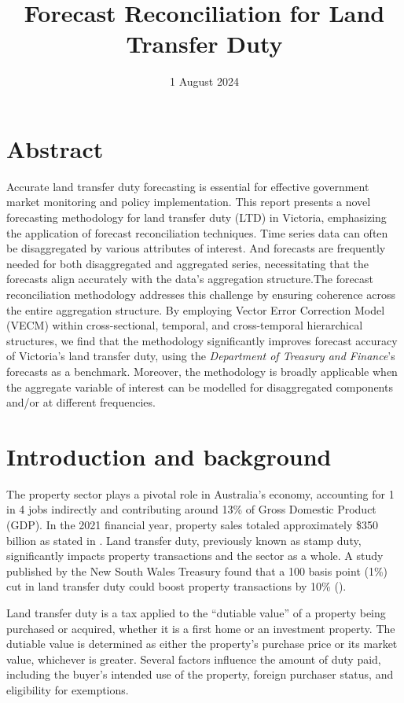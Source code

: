\documentclass[
  11pt,
  a4paper,
]{article}
\title{Forecast Reconciliation for Land Transfer Duty}
\date{1 August 2024}
\author{\sf{\Large\textbf{Hoang Do} \\[0.5cm]}}
\makeatletter
\def\maketitle{\front{\expandafter{\@title}}{\@author}{\@organization}}
\makeatother
\begin{document}
\maketitle

\section{Abstract}\label{abstract}

Accurate land transfer duty forecasting is essential for effective
government market monitoring and policy implementation. This report
presents a novel forecasting methodology for land transfer duty (LTD) in
Victoria, emphasizing the application of forecast reconciliation
techniques. Time series data can often be disaggregated by various
attributes of interest. And forecasts are frequently needed for both
disaggregated and aggregated series, necessitating that the forecasts
align accurately with the data's aggregation structure.The forecast
reconciliation methodology addresses this challenge by ensuring
coherence across the entire aggregation structure. By employing Vector
Error Correction Model (VECM) within cross-sectional, temporal, and
cross-temporal hierarchical structures, we find that the methodology
significantly improves forecast accuracy of Victoria's land transfer
duty, using the \emph{Department of Treasury and Finance}'s forecasts as
a benchmark. Moreover, the methodology is broadly applicable when the
aggregate variable of interest can be modelled for disaggregated
components and/or at different frequencies.

\section{Introduction and background}\label{introduction-and-background}

The property sector plays a pivotal role in Australia's economy,
accounting for 1 in 4 jobs indirectly and contributing around 13\% of
Gross Domestic Product (GDP). In the 2021 financial year, property sales
totaled approximately \$350 billion as stated in \textcite{reia_2022}.
Land transfer duty, previously known as stamp duty, significantly
impacts property transactions and the sector as a whole. A study
published by the New South Wales Treasury found that a 100 basis point
(1\%) cut in land transfer duty could boost property transactions by
10\% (\textcite{nsw_treasury_2021}).

Land transfer duty is a tax applied to the ``dutiable value'' of a
property being purchased or acquired, whether it is a first home or an
investment property. The dutiable value is determined as either the
property's purchase price or its market value, whichever is greater.
Several factors influence the amount of duty paid, including the buyer's
intended use of the property, foreign purchaser status, and eligibility
for exemptions.
\end{document}
